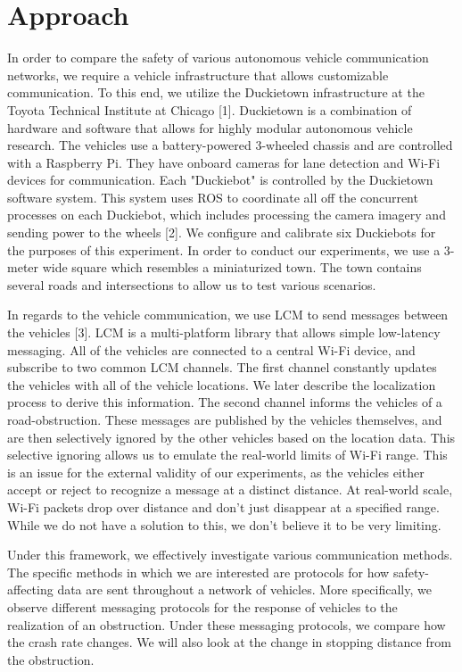 \section{Approach}
\label{sec:solution}

In order to compare the safety of various autonomous vehicle communication networks, we require a vehicle infrastructure that allows customizable communication. To this end, we utilize the Duckietown infrastructure at the Toyota Technical Institute at Chicago [1]. Duckietown is a combination of hardware and software that allows for highly modular autonomous vehicle research. The vehicles use a battery-powered 3-wheeled chassis and are controlled with a Raspberry Pi. They have onboard cameras for lane detection and Wi-Fi devices for communication. Each "Duckiebot" is controlled by the Duckietown software system. This system uses ROS to coordinate all off the concurrent processes on each Duckiebot, which includes processing the camera imagery and sending power to the wheels [2]. We configure and calibrate six Duckiebots for the purposes of this experiment. In order to conduct our experiments, we use a 3-meter wide square which resembles a miniaturized town. The town contains several roads and intersections to allow us to test various scenarios.

In regards to the vehicle communication, we use LCM to send messages between the vehicles [3]. LCM is a multi-platform library that allows simple low-latency messaging. All of the vehicles are connected to a central Wi-Fi device, and subscribe to two common LCM channels. The first channel constantly updates the vehicles with all of the vehicle locations. We later describe the localization process to derive this information. The second channel informs the vehicles of a road-obstruction. These messages are published by the vehicles themselves, and are then selectively ignored by the other vehicles based on the location data. This selective ignoring allows us to emulate the real-world limits of Wi-Fi range. This is an issue for the external validity of our experiments, as the vehicles either accept or reject to recognize a message at a distinct distance. At real-world scale, Wi-Fi packets drop over distance and don't just disappear at a specified range. While we do not have a solution to this, we don't believe it to be very limiting.

Under this framework, we effectively investigate various communication methods. The specific methods in which we are interested are protocols for how safety-affecting data are sent throughout a network of vehicles. More specifically, we observe different messaging protocols for the response of vehicles to the realization of an obstruction. Under these messaging protocols, we compare how the crash rate changes. We will also look at the change in stopping distance from the obstruction.

